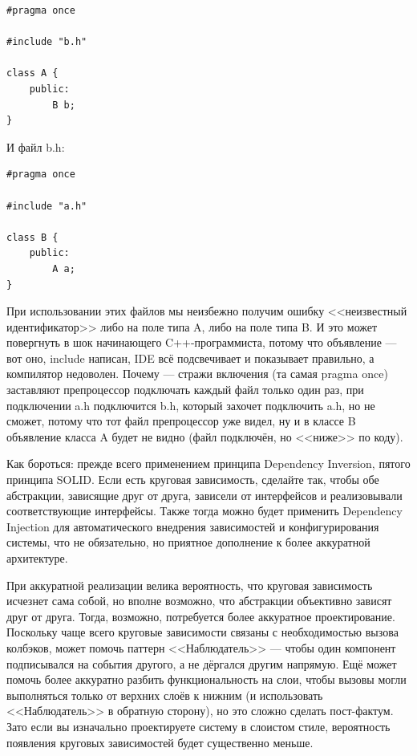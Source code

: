 \documentclass{../../text-style}
\begin{document}
\begin{verbatim}
#pragma once

#include "b.h"

class A {
    public:
        B b;
}
\end{verbatim}

И файл b.h:

\begin{verbatim}
#pragma once

#include "a.h"

class B {
    public:
        A a;
}
\end{verbatim}

При использовании этих файлов мы неизбежно получим ошибку <<неизвестный идентификатор>> либо на поле типа A, либо на поле типа B. И это может повергнуть в шок начинающего C++-программиста, потому что объявление --- вот оно, include написан, IDE всё подсвечивает и показывает правильно, а компилятор недоволен. Почему --- стражи включения (та самая pragma once) заставляют препроцессор подключать каждый файл только один раз, при подключении a.h подключится b.h, который захочет подключить a.h, но не сможет, потому что тот файл препроцессор уже видел, ну и в классе B объявление класса A будет не видно (файл подключён, но <<ниже>> по коду).

Как бороться: прежде всего применением принципа Dependency Inversion, пятого принципа SOLID. Если есть круговая зависимость, сделайте так, чтобы обе абстракции, зависящие друг от друга, зависели от интерфейсов и реализовывали соответствующие интерфейсы. Также тогда можно будет применить Dependency Injection для автоматического внедрения зависимостей и конфигурирования системы, что не обязательно, но приятное дополнение к более аккуратной архитектуре.

При аккуратной реализации велика вероятность, что круговая зависимость исчезнет сама собой, но вполне возможно, что абстракции объективно зависят друг от друга. Тогда, возможно, потребуется более аккуратное проектирование. Поскольку чаще всего круговые зависимости связаны с необходимостью вызова колбэков, может помочь паттерн <<Наблюдатель>> --- чтобы один компонент подписывался на события другого, а не дёргался другим напрямую. Ещё может помочь более аккуратно разбить функциональность на слои, чтобы вызовы могли выполняться только от верхних слоёв к нижним (и использовать <<Наблюдатель>> в обратную сторону), но это сложно сделать пост-фактум. Зато если вы изначально проектируете систему в слоистом стиле, вероятность появления круговых зависимостей будет существенно меньше.
\end{document}
